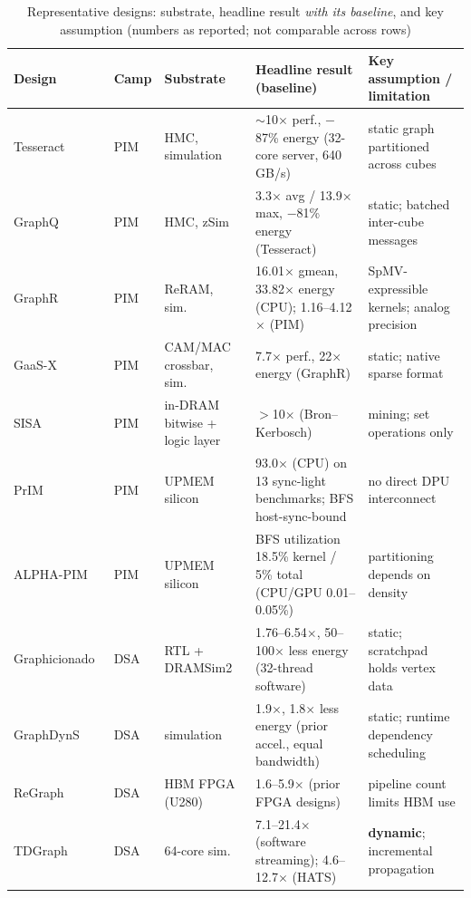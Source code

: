 \documentclass[journal,onecolumn]{IEEEtran}
\begin{document}
\begin{table}[t]
\caption{Representative designs: substrate, headline result \emph{with its baseline}, and key assumption (numbers as reported; not comparable across rows)}
\label{tab:designs}
\centering\scriptsize
\begin{tabularx}{\textwidth}{@{}L{1.9cm}L{0.9cm}L{3.0cm}YL{3.3cm}@{}}
\toprule
Design & Camp & Substrate & Headline result (baseline) & Key assumption / limitation \\
\midrule
Tesseract~\cite{ahn2015tesseract} & PIM & HMC, simulation & $\sim$10$\times$ perf., $-$87\% energy (32-core server, 640\,GB/s) & static graph partitioned across cubes \\
GraphQ~\cite{zhuo2019graphq} & PIM & HMC, zSim & 3.3$\times$ avg / 13.9$\times$ max, $-$81\% energy (Tesseract) & static; batched inter-cube messages \\
GraphR~\cite{song2018graphr} & PIM & ReRAM, sim.\ & 16.01$\times$ gmean, 33.82$\times$ energy (CPU); 1.16--4.12$\times$ (PIM) & SpMV-expressible kernels; analog precision \\
GaaS-X~\cite{challapalle2020gaasx} & PIM & CAM/MAC crossbar, sim.\ & 7.7$\times$ perf., 22$\times$ energy (GraphR) & static; native sparse format \\
SISA~\cite{besta2021sisa} & PIM & in-DRAM bitwise + logic layer & $>$10$\times$ (Bron--Kerbosch) & mining; set operations only \\
PrIM~\cite{gomezluna2022prim} & PIM & UPMEM silicon & 93.0$\times$ (CPU) on 13 sync-light benchmarks; BFS host-sync-bound & no direct DPU interconnect \\
ALPHA-PIM~\cite{barkhordar2025alphapim} & PIM & UPMEM silicon & BFS utilization 18.5\% kernel / 5\% total (CPU/GPU 0.01--0.05\%) & partitioning depends on density \\
Graphicionado~\cite{ham2016graphicionado} & DSA & RTL + DRAMSim2 & 1.76--6.54$\times$, 50--100$\times$ less energy (32-thread software) & static; scratchpad holds vertex data \\
GraphDynS~\cite{yan2019graphdyns} & DSA & simulation & 1.9$\times$, 1.8$\times$ less energy (prior accel., equal bandwidth) & static; runtime dependency scheduling \\
ReGraph~\cite{chen2022regraph} & DSA & HBM FPGA (U280) & 1.6--5.9$\times$ (prior FPGA designs) & pipeline count limits HBM use \\
TDGraph~\cite{zhao2022tdgraph} & DSA & 64-core sim.\ & 7.1--21.4$\times$ (software streaming); 4.6--12.7$\times$ (HATS) & \textbf{dynamic}; incremental propagation \\

\end{tabularx}
\end{table}
\end{document}
